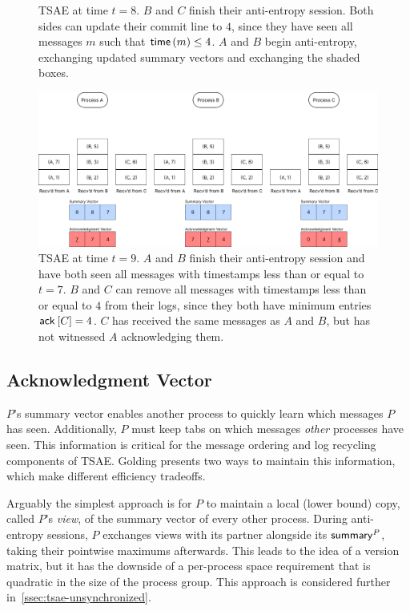 \documentclass[]             %
{NASA}                       %
\theoremstyle{definition}
\begin{document}
\begin{landscape}
\begin{figure}[ht]
    \caption{TSAE at time $t=8$. $B$ and $C$ finish their anti-entropy session. Both sides can update their commit line to $4$, since they have seen all messages $m$ such that $\mathsf{time}\left(m\right) \leq 4$. $A$ and $B$ begin anti-entropy, exchanging updated summary vectors and exchanging the shaded boxes.}
    \label{fig:tsae6}
  \end{figure}
  \begin{figure}[ht]
    \centering
    \includegraphics[width=1.4\textwidth]{images/tsae/TSAE9.png}
    \caption{TSAE at time $t=9$. $A$ and $B$ finish their anti-entropy
      session and have both seen all messages with timestamps less than
      or equal to $t = 7$. $B$ and $C$ can remove all messages with
      timestamps less than or equal to $4$ from their logs, since they
      both have minimum entries $\mathsf{ack}^{}\left[C\right] = 4$. $C$ has received the
      same messages as $A$ and $B$, but has not witnessed $A$
      acknowledging them.}
    \label{fig:tsae7}
  \end{figure}
\end{landscape}

\subsection{Acknowledgment Vector}
\label{ssec:tsae-acknowledgment}
$P$'s summary vector enables another process to quickly learn which
messages $P$ has seen. Additionally, $P$ must keep tabs on which
messages \emph{other} processes have seen. This information is
critical for the message ordering and log recycling components of
TSAE. Golding presents two ways to maintain this information, which
make different efficiency tradeoffs.

Arguably the simplest approach is for $P$ to maintain a local (lower
bound) copy, called $P$'s \emph{view}, of the summary vector of every
other process. During anti-entropy sessions, $P$ exchanges views with
its partner alongside its $\mathsf{summary}^{P}$, taking their pointwise
maximums afterwards. This leads to the idea of a version matrix, but
it has the downside of a per-process space requirement that is
quadratic in the size of the process group. This approach is
considered further in~\ref{ssec:tsae-unsynchronized}.
\end{document}
